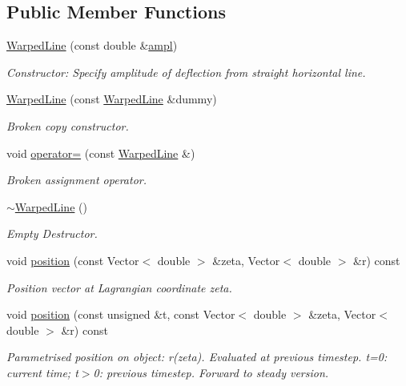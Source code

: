 \subsection*{Public Member Functions}
\begin{DoxyCompactItemize}
\item 
\hyperlink{classWarpedLine_a9d80dca2c907b426f7130579c94f3310}{Warped\+Line} (const double \&\hyperlink{classWarpedLine_ae43c2f997b9c0de62783375341ac5794}{ampl})
\begin{DoxyCompactList}\small\item\em Constructor\+: Specify amplitude of deflection from straight horizontal line. \end{DoxyCompactList}\item 
\hyperlink{classWarpedLine_a53a7426303864ea2d34aeba0a3f6324f}{Warped\+Line} (const \hyperlink{classWarpedLine}{Warped\+Line} \&dummy)
\begin{DoxyCompactList}\small\item\em Broken copy constructor. \end{DoxyCompactList}\item 
void \hyperlink{classWarpedLine_ae2ee796906c0caa7e94f277f6fc499e1}{operator=} (const \hyperlink{classWarpedLine}{Warped\+Line} \&)
\begin{DoxyCompactList}\small\item\em Broken assignment operator. \end{DoxyCompactList}\item 
\hyperlink{classWarpedLine_a4cb07fb7f06d42e2008afe65d8750cad}{$\sim$\+Warped\+Line} ()
\begin{DoxyCompactList}\small\item\em Empty Destructor. \end{DoxyCompactList}\item 
void \hyperlink{classWarpedLine_aaeef89818148ee3a305c561e91c8851d}{position} (const Vector$<$ double $>$ \&zeta, Vector$<$ double $>$ \&r) const
\begin{DoxyCompactList}\small\item\em Position vector at Lagrangian coordinate zeta. \end{DoxyCompactList}\item 
void \hyperlink{classWarpedLine_a415d50f6bb49bd903015b51c66e93cd2}{position} (const unsigned \&t, const Vector$<$ double $>$ \&zeta, Vector$<$ double $>$ \&r) const
\begin{DoxyCompactList}\small\item\em Parametrised position on object\+: r(zeta). Evaluated at previous timestep. t=0\+: current time; t$>$0\+: previous timestep. Forward to steady version. \end{DoxyCompactList}\item 

\end{DoxyCompactItemize}
